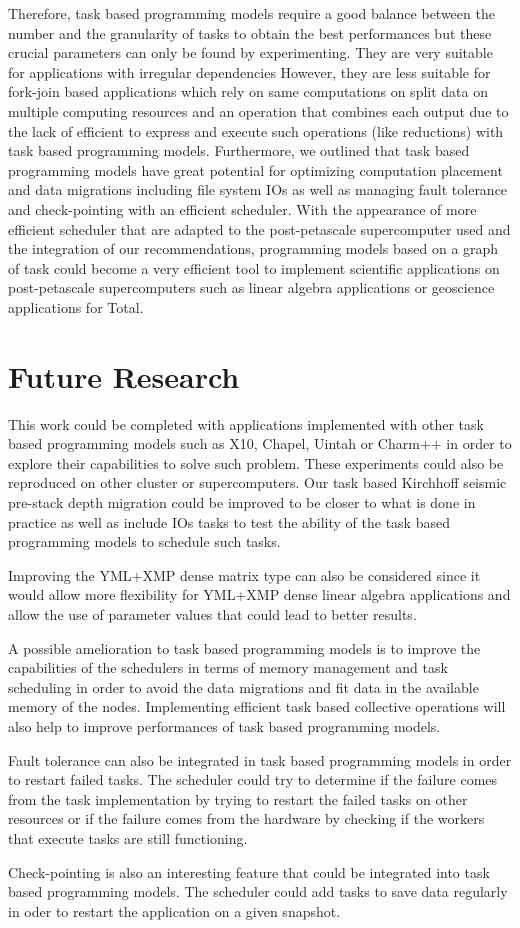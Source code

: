 Therefore, task based programming models require a good balance between the number and the granularity of tasks to obtain the best performances but these crucial parameters can only be found by experimenting.
They are very suitable for applications with irregular dependencies
However, they are less suitable for fork-join based applications which rely on same computations on split data on multiple computing resources and an operation that combines each output due to the lack of efficient to express and execute such operations (like reductions) with task based programming models.
Furthermore, we outlined that task based programming models have great potential for optimizing computation placement and data migrations including file system IOs as well as managing fault tolerance and check-pointing with an efficient scheduler.
With the appearance of more efficient scheduler that are adapted to the post-petascale supercomputer used and the integration of our recommendations, programming models based on a graph of task could become a very efficient tool to implement scientific applications on post-petascale supercomputers such as linear algebra applications or geoscience applications for Total.

\section{Future Research}

This work could be completed with applications implemented with other task based programming models such as X10, Chapel, Uintah or Charm++ in order to explore their capabilities to solve such problem.
These experiments could also be reproduced on other cluster or supercomputers.
Our task based Kirchhoff seismic pre-stack depth migration could be improved to be closer to what is done in practice as well as include IOs tasks to test the ability of the task based programming models to schedule such tasks.

Improving the YML+XMP dense matrix type can also be considered since it would allow more flexibility for YML+XMP dense linear algebra applications and allow the use of parameter values that could lead to better results.

A possible amelioration to task based programming models is to improve the capabilities of the schedulers in terms of memory management and task scheduling in order to avoid the data migrations and fit data in the available memory of the nodes.
Implementing efficient task based collective operations will also help to improve performances of task based programming models.

Fault tolerance can also be integrated in task based programming models in order to restart failed tasks.
The scheduler could try to determine if the failure comes from the task implementation by trying to restart the failed tasks on other resources or if the failure comes from the hardware by checking if the workers that execute tasks are still functioning.

Check-pointing is also an interesting feature that could be integrated into task based programming models.
The scheduler could add tasks to save data regularly in oder to restart the application on a given snapshot.